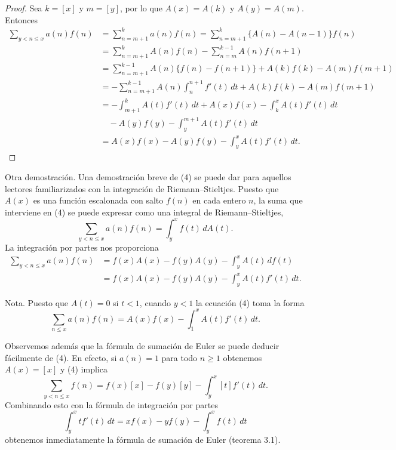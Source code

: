 \documentclass[12pt,a4paper]{book}
\begin{document}
    \begin{proof}
        Sea $k=[x]$ y $m=[y]$, por lo que $A(x)=A(k)$ y $A(y)=A(m)$. Entonces
        \begin{align*}
            \sum_{y<n\leq x}a(n)f(n)&=\sum_{n=m+1}^{k}a(n)f(n)=\sum_{n=m+1}^{k}\{A(n)-A(n-1)\}f(n)\\
            &=\sum_{n=m+1}^{k}A(n)f(n)-\sum_{n=m}^{k-1}A(n)f(n+1)\\
            &=\sum_{n=m+1}^{k-1}A(n)\{f(n)-f(n+1)\}+A(k)f(k)-A(m)f(m+1)\\
            &=-\sum_{n=m+1}^{k-1}A(n)\int_n^{n+1}f'(t)\,dt+A(k)f(k)-A(m)f(m+1)\\
            &=-\int_{m+1}^{k}A(t)f'(t)\,dt+A(x)f(x)-\int_k^x A(t)f'(t)\,dt\\
            &\quad-A(y)f(y)-\int_y^{m+1}A(t)f'(t)\,dt\\
            &=A(x)f(x)-A(y)f(y)-\int_y^x A(t)f'(t)\,dt.
        \end{align*}
    \end{proof}

    Otra demostración. Una demostración breve de (4) se puede dar para aquellos
    lectores familiarizados con la integración de Riemann--Stieltjes. Puesto que
    $A(x)$ es una función escalonada con salto $f(n)$ en cada entero $n$, la suma que
    interviene en (4) se puede expresar como una integral de Riemann--Stieltjes,
    \begin{equation*}
        \sum_{y<n\leq x}a(n)f(n)=\int_y^x f(t)\,dA(t).
    \end{equation*}
    La integración por partes nos proporciona
    \begin{align*}
        \sum_{y<n\leq x}a(n)f(n)&=f(x)A(x)-f(y)A(y)-\int_y^x A(t)\,df(t)\\
        &=f(x)A(x)-f(y)A(y)-\int_y^x A(t)f'(t)\,dt.
    \end{align*}

    Nota. Puesto que $A(t)=0$ si $t<1$, cuando $y<1$ la ecuación (4) toma la forma
    \begin{equation}
        \sum_{n\leq x}a(n)f(n)=A(x)f(x)-\int_1^x A(t)f'(t)\,dt.
    \end{equation}

    Observemos además que la fórmula de sumación de Euler se puede deducir fácilmente
    de (4). En efecto, si $a(n)=1$ para todo $n\geq1$ obtenemos $A(x)=[x]$ y (4)
    implica
    \begin{equation*}
        \sum_{y<n\leq x}f(n)=f(x)[x]-f(y)[y]-\int_y^x[t]f'(t)\,dt.
    \end{equation*}
    Combinando esto con la fórmula de integración por partes
    \begin{equation*}
        \int_y^x tf'(t)\,dt=xf(x)-yf(y)-\int_y^x f(t)\,dt
    \end{equation*}
    obtenemos inmediatamente la fórmula de sumación de Euler (teorema 3.1).
\end{document}
